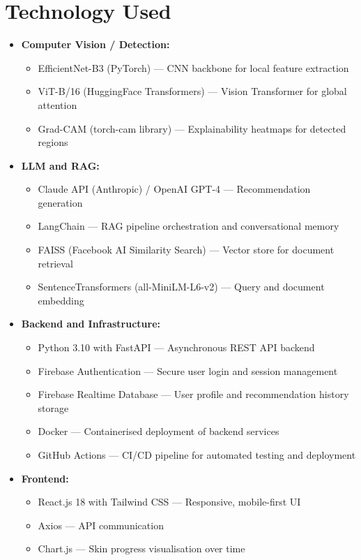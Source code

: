 \section{Technology Used}
\begin{itemize}
    \item \textbf{Computer Vision / Detection:}
    \begin{itemize}[label=$\diamond$]
        \item EfficientNet-B3 (PyTorch) — CNN backbone for local feature extraction
        \item ViT-B/16 (HuggingFace Transformers) — Vision Transformer for global attention
        \item Grad-CAM (torch-cam library) — Explainability heatmaps for detected regions
    \end{itemize}
    \vspace{0.3cm}

    \item \textbf{LLM and RAG:}
    \begin{itemize}[label=$\diamond$]
        \item Claude API (Anthropic) / OpenAI GPT-4 — Recommendation generation
        \item LangChain — RAG pipeline orchestration and conversational memory
        \item FAISS (Facebook AI Similarity Search) — Vector store for document retrieval
        \item SentenceTransformers (all-MiniLM-L6-v2) — Query and document embedding
    \end{itemize}
    \vspace{0.3cm}

    \item \textbf{Backend and Infrastructure:}
    \begin{itemize}[label=$\diamond$]
        \item Python 3.10 with FastAPI — Asynchronous REST API backend
        \item Firebase Authentication — Secure user login and session management
        \item Firebase Realtime Database — User profile and recommendation history storage
        \item Docker — Containerised deployment of backend services
        \item GitHub Actions — CI/CD pipeline for automated testing and deployment
    \end{itemize}
    \vspace{0.3cm}

    \item \textbf{Frontend:}
    \begin{itemize}[label=$\diamond$]
        \item React.js 18 with Tailwind CSS — Responsive, mobile-first UI
        \item Axios — API communication
        \item Chart.js — Skin progress visualisation over time
    \end{itemize}
    \vspace{0.5cm}
\end{itemize}

